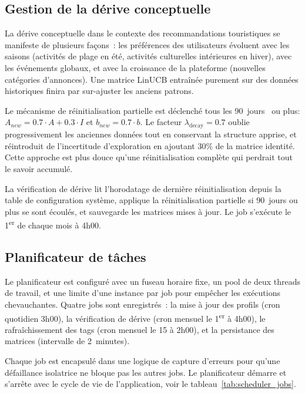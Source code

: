 \subsection{Gestion de la dérive conceptuelle}

La dérive conceptuelle dans le contexte des recommandations touristiques se manifeste de
plusieurs façons~: les préférences des utilisateurs évoluent avec les saisons (activités
de plage en été, activités culturelles intérieures en hiver), avec les événements globaux,
et avec la croissance de la plateforme (nouvelles catégories d'annonces). Une matrice LinUCB
entraînée purement sur des données historiques finira par sur-ajuster les anciens patrons.

Le mécanisme de réinitialisation partielle est déclenché tous les 90~jours~ ou plus:
$A_{new} = 0.7 \cdot A + 0.3 \cdot I$ et $b_{new} = 0.7 \cdot b$. Le facteur
$\lambda_{\text{decay}} = 0.7$ oublie progressivement les anciennes données tout en
conservant la structure apprise, et réintroduit de l'incertitude d'exploration en ajoutant
30\% de la matrice identité. Cette approche est plus douce qu'une réinitialisation complète
qui perdrait tout le savoir accumulé.

La vérification de dérive lit l'horodatage de dernière réinitialisation
depuis la table de configuration système, applique la réinitialisation
partielle si 90~jours ou plus se sont écoulés, et sauvegarde les matrices mises à jour.
Le job s'exécute le 1\textsuperscript{er} de chaque mois à 4h00.


\subsection{Planificateur de tâches}

Le planificateur est configuré avec un fuseau horaire fixe, un pool de deux threads de
travail, et une limite d'une instance par job pour empêcher les exécutions chevauchantes.
Quatre jobs sont enregistrés~: la mise à jour des profils (cron quotidien 3h00), la
vérification de dérive (cron mensuel le 1\textsuperscript{er} à 4h00), le rafraîchissement
des tags (cron mensuel le 15 à 2h00), et la persistance des matrices (intervalle de
2~minutes).

Chaque job est encapsulé dans une logique de capture d'erreurs pour qu'une défaillance
isolatrice ne bloque pas les autres jobs. Le planificateur démarre et s'arrête avec le
cycle de vie de l'application, voir le tableau~\ref{tab:scheduler_jobs}.

